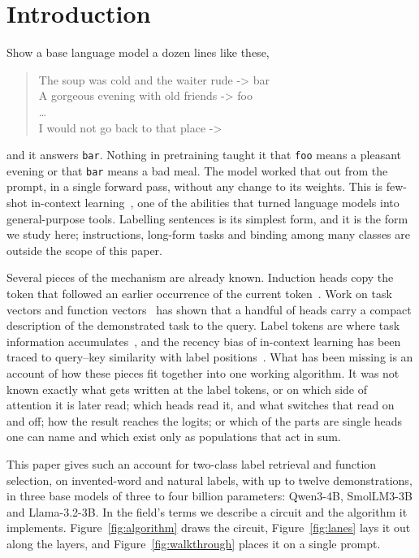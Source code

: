 \documentclass{article}
\begin{document}
\section{Introduction}\label{sec:intro}
Show a base language model a dozen lines like these,
\begin{quote}\small\ttfamily
The soup was cold and the waiter rude -> bar\\
A gorgeous evening with old friends -> foo\\
\ldots\\
I would not go back to that place ->
\end{quote}
and it answers \texttt{bar}. Nothing in pretraining taught it that \texttt{foo} means a pleasant evening or that \texttt{bar} means a bad meal. The model worked that out from the prompt, in a single forward pass, without any change to its weights. This is few-shot in-context learning~\citep{brown2020fewshot}, one of the abilities that turned language models into general-purpose tools. Labelling sentences is its simplest form, and it is the form we study here; instructions, long-form tasks and binding among many classes are outside the scope of this paper.

Several pieces of the mechanism are already known. Induction heads copy the token that followed an earlier occurrence of the current token~\citep{olsson2022induction}. Work on task vectors and function vectors~\citep{hendel2023taskvectors,todd2023fv} has shown that a handful of heads carry a compact description of the demonstrated task to the query. Label tokens are where task information accumulates~\citep{cho2024circuit,zheng2024labelwords,hu2025addition}, and the recency bias of in-context learning has been traced to query--key similarity with label positions~\citep{yu2024qk}. What has been missing is an account of how these pieces fit together into one working algorithm. It was not known exactly what gets written at the label tokens, or on which side of attention it is later read; which heads read it, and what switches that read on and off; how the result reaches the logits; or which of the parts are single heads one can name and which exist only as populations that act in sum.

This paper gives such an account for two-class label retrieval and function selection, on invented-word and natural labels, with up to twelve demonstrations, in three base models of three to four billion parameters: Qwen3-4B, SmolLM3-3B and Llama-3.2-3B. In the field's terms we describe a circuit and the algorithm it implements. Figure~\ref{fig:algorithm} draws the circuit, Figure~\ref{fig:lanes} lays it out along the layers, and Figure~\ref{fig:walkthrough} places it on a single prompt.
\end{document}
